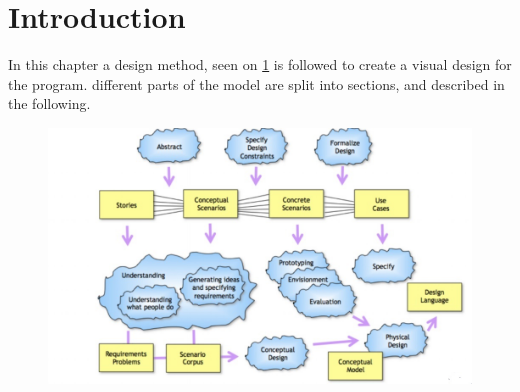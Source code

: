 \section{Introduction}
In this chapter a design method, seen on \cref{scenarioModel} is followed to create a visual design for the program. different parts of the model are split into sections, and described in the following.

\begin{figure}[H]
	\centering
	\includegraphics[width=1\textwidth]{Grafik/scenarioModel}
	\label{scenarioModel}
\end{figure}